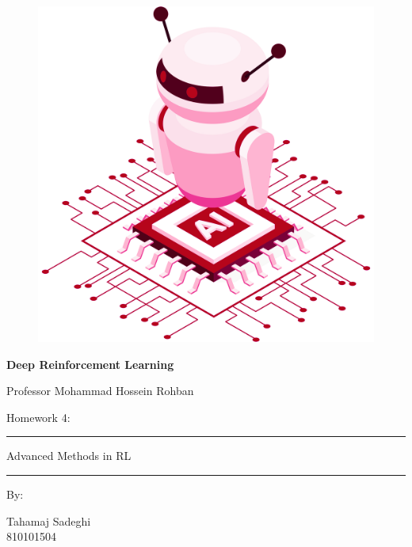 \documentclass[12pt]{article}
\begin{document}
\thispagestyle{plain}

\begin{center}

\vspace*{-1.5cm}
\begin{figure}[!h]
    \centering
    \includegraphics[width=0.7\linewidth]{figs/cover-std.png}
\end{figure}

{

{\color{DarkBlue} {\fontsize{30}{50} \textbf{
Deep Reinforcement Learning
}}}

{\color{DarkBlue} {\Large
Professor Mohammad Hossein Rohban
}}
}


\vspace{20pt}

{


{\color{RedOrange}
{\Large
Homework 4:
}\\
}
{\color{BrickRed}
\rule{12cm}{0.5pt}

{\Huge
Advanced Methods in RL
}
\rule{12cm}{0.5pt}
}

\vspace{10pt}

{\color{RoyalPurple} { \small By:} } \\
\vspace{10pt}

{\color{Blue} { \LARGE Tahamaj Sadeghi } } \\
\vspace{5pt}
{\color{RoyalBlue} { \Large 810101504 } }


}
\end{center}
\end{document}

